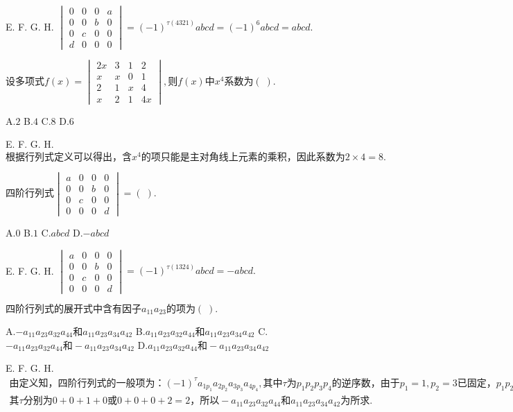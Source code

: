 E.   F.   G.   H.
$\begin{vmatrix}0&0&0&a\\0&0&b&0\\0&c&0&0\\d&0&0&0\end{vmatrix}=(-1)^{\tau(4321)}abcd=(-1)^6abcd=abcd.$


$\mathrm{设多项式}f(x)=\begin{vmatrix}2x&3&1&2\\x&x&0&1\\2&1&x&4\\x&2&1&4x\end{vmatrix},则f(x)中x^4\mathrm{系数为}(\;).$

A.$2$   B.$4$   C.$8$   D.$6$

E.   F.   G.   H.
$\mathrm{根据行列式定义可以得出}，含x^4\mathrm{的项只能是主对角线上元素的乘积}，\mathrm{因此系数为}2\times4=8.$


$\mathrm{四阶行列式}\begin{vmatrix}a&0&0&0\\0&0&b&0\\0&c&0&0\\0&0&0&d\end{vmatrix}=(\;).$

A.$0$   B.$1$   C.$abcd$   D.$-abcd$

E.   F.   G.   H.
$\begin{vmatrix}a&0&0&0\\0&0&b&0\\0&c&0&0\\0&0&0&d\end{vmatrix}=(-1)^{\tau(1324)}abcd=-abcd.$


$\mathrm{四阶行列式的展开式中含有因子}a_{11}a_{23}\mathrm{的项为}(\;).$

A.$-a_{11}a_{23}a_{32}a_{44}和a_{11}a_{23}a_{34}a_{42}$   B.$a_{11}a_{23}a_{32}a_{44}和a_{11}a_{23}a_{34}a_{42}$   C.$-a_{11}a_{23}a_{32}a_{44}和-a_{11}a_{23}a_{34}a_{42}$   D.$a_{11}a_{23}a_{32}a_{44}和-a_{11}a_{23}a_{34}a_{42}$

E.   F.   G.   H.
$\begin{array}{l}\mathrm{由定义知}，\mathrm{四阶行列式的一般项为}：(-1)^\tau a_{1p_1}a_{2p_2}a_{3p_3}a_{4p_4},\mathrm{其中}\tau 为p_1p_2p_3p_4\mathrm{的逆序数}，\mathrm{由于}p_1=1,p_2=3\mathrm{已固定}，p_1p_2p_3p_4\mathrm{只能形如}13xx,即1324或1342，\\其\tau\mathrm{分别为}0+0+1+0或0+0+0+2=2，\mathrm{所以}-a_{11}a_{23}a_{32}a_{44}和a_{11}a_{23}a_{34}a_{42}\mathrm{为所求}.\\\end{array}$



